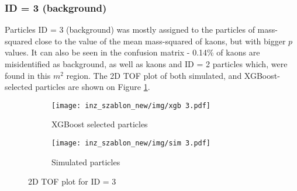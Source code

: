 \subsubsection{ID = 3 (background)}
Particles ID = 3 (background) was mostly assigned to the particles of mass-squared close to the value of the mean mass-squared of kaons, but with bigger $p$ values. It can also be seen in the confusion matrix - 0.14\% of kaons are misidentified as background, as well as kaons and ID = 2 particles which, were found in this $m^2$ region. The 2D TOF plot of both simulated, and XGBoost-selected particles are shown on Figure \ref{2D TOF id3}.
\begin{figure}[H]
 \centering
    \begin{subfigure}[b]{0.8\linewidth} 
        \centering
        \texttt{[image: inz\_szablon\_new/img/xgb 3.pdf]}
        \caption{XGBoost selected particles}
        \vspace{0.3cm}
    \end{subfigure}
     \hfill
       \begin{subfigure}[b]{0.8\linewidth}
        \centering
        \texttt{[image: inz\_szablon\_new/img/sim 3.pdf]}
        \caption{Simulated particles}
        \vspace{0.3cm}
    \end{subfigure}
    \caption{2D TOF plot for ID = 3}
    \label{2D TOF id3}
\end{figure}
\clearpage